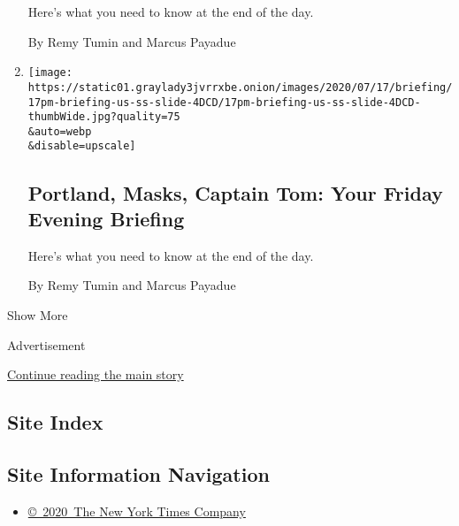 \begin{enumerate}
  Here's what you need to know at the end of the day.

  By Remy Tumin and Marcus Payadue
\item
  \href{/2020/07/17/briefing/portland-masks-captain-tom-.html}{}

  \texttt{[image: https://static01.graylady3jvrrxbe.onion/images/2020/07/17/briefing/17pm-briefing-us-ss-slide-4DCD/17pm-briefing-us-ss-slide-4DCD-thumbWide.jpg?quality=75\\\&auto=webp\\\&disable=upscale]}

  \hypertarget{portland-masks-captain-tom-your-friday-evening-briefing}{%
  \subsection{Portland, Masks, Captain Tom: Your Friday Evening
  Briefing}\label{portland-masks-captain-tom-your-friday-evening-briefing}}

  Here's what you need to know at the end of the day.

  By Remy Tumin and Marcus Payadue
\end{enumerate}

Show More

Advertisement

\protect\hyperlink{after-mid2}{Continue reading the main story}

\hypertarget{site-index}{%
\subsection{Site Index}\label{site-index}}

\hypertarget{site-information-navigation}{%
\subsection{Site Information
Navigation}\label{site-information-navigation}}

\begin{itemize}
\tightlist
\item
  \href{https://help.nytimes3xbfgragh.onion/hc/en-us/articles/115014792127-Copyright-notice}{©~2020~The
  New York Times Company}
\end{itemize}

